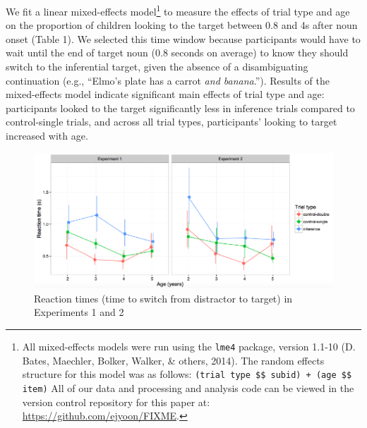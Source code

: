 \documentclass[a4paper,man,apacite,floatsintext]{apa6}
\newenvironment{CodeChunk}{}{}
\begin{document}
We fit a linear mixed-effects model\footnote{All mixed-effects models
  were run using the \texttt{lme4} package, version 1.1-10 (D. Bates,
  Maechler, Bolker, Walker, \& others, 2014). The random effects
  structure for this model was as follows:
  \texttt{(trial type \$\textbar{}\$ subid) + (age \$\textbar{}\$ item)}
  All of our data and processing and analysis code can be viewed in the
  version control repository for this paper at:
  \url{https://github.com/ejyoon/FIXME}.} to measure the effects of
trial type and age on the proportion of children looking to the target
between 0.8 and 4s after noun onset (Table 1). We selected this time
window because participants would have to wait until the end of target
noun (0.8 seconds on average) to know they should switch to the
inferential target, given the absence of a disambiguating continuation
(e.g., ``Elmo's plate has a carrot \emph{and banana}.''). Results of the
mixed-effects model indicate significant main effects of trial type and
age: participants looked to the target significantly less in inference
trials compared to control-single trials, and across all trial types,
participants' looking to target increased with age.

\begin{CodeChunk}
\begin{figure}[tb]

{\centering \includegraphics{figs/et_rt-1} 

}

\caption[Reaction times (time to switch from distractor to target) in Experiments 1 and 2]{Reaction times (time to switch from distractor to target) in Experiments 1 and 2}\label{fig:et_rt}
\end{figure}
\end{CodeChunk}
\end{document}
